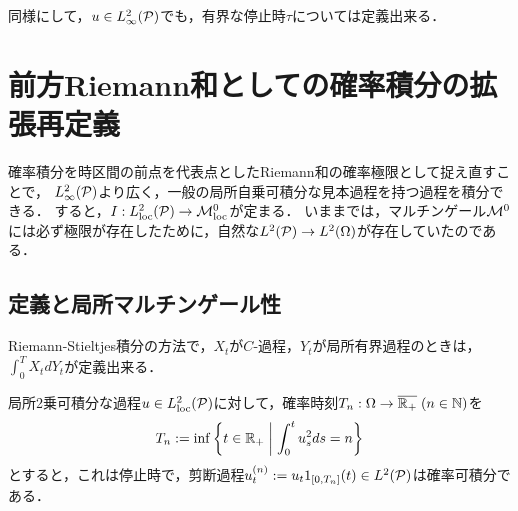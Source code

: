 \documentclass[uplatex,dvipdfmx]{jsreport}
\begin{document}
\begin{corollary}
    同様にして，$u\in L^2_\infty(\P)$でも，有界な停止時$\tau$については定義出来る．
\end{corollary}

\section{前方Riemann和としての確率積分の拡張再定義}

\begin{tcolorbox}[colframe=ForestGreen, colback=ForestGreen!10!white,breakable,colbacktitle=ForestGreen!40!white,coltitle=black,fonttitle=\bfseries\sffamily,
title=]
    確率積分を時区間の前点を代表点としたRiemann和の確率極限として捉え直すことで，
    $L^2_\infty(\P)$より広く，一般の局所自乗可積分な見本過程を持つ過程を積分できる．
    すると，$I:L^2_\loc(\P)\to\M^0_\loc$が定まる．
    いままでは，マルチンゲール$\M^0$には必ず極限が存在したために，自然な$L^2(\P)\to L^2(\Om)$が存在していたのである．
\end{tcolorbox}

\subsection{定義と局所マルチンゲール性}

\begin{tcolorbox}[colframe=ForestGreen, colback=ForestGreen!10!white,breakable,colbacktitle=ForestGreen!40!white,coltitle=black,fonttitle=\bfseries\sffamily,
title=]
    Riemann-Stieltjes積分の方法で，$X_t$が$C$-過程，$Y_t$が局所有界過程のときは，$\int^T_0X_tdY_t$が定義出来る．
\end{tcolorbox}

\begin{lemma}
    局所2乗可積分な過程$u\in L^2_\loc(\P)$に対して，確率時刻$T_n:\Om\to\o{\R_+}\;(n\in\N)$を
    \[T_n:=\inf\Brace{t\in\R_+\;\middle|\;\int^t_0u_s^2ds=n}\]
    とすると，これは停止時で，剪断過程$u_t^{(n)}:=u_t1_{[0,T_n]}(t)\in L^2(\P)$は確率可積分である．
\end{lemma}
\end{document}
